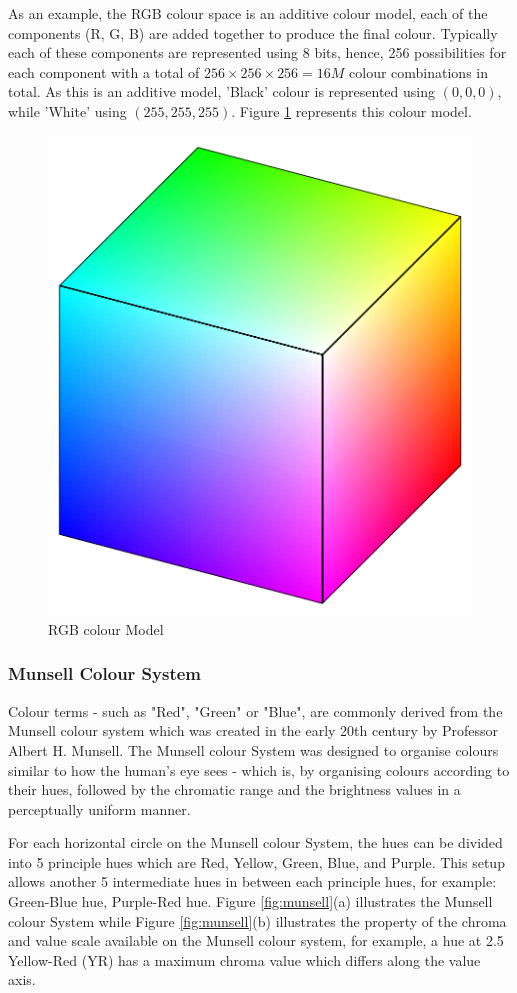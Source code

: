 As an example, the RGB colour space is an additive colour model, each of the components (R, G, B) are added together to produce the final colour. Typically each of these components are represented using 8 bits, hence, 256 possibilities for each component with a total of $256 \times 256 \times 256 = 16M$ colour combinations in total. As this is an additive model, 'Black' colour is  represented using $(0, 0, 0)$, while 'White' using $(255, 255, 255)$. Figure \ref{fig:rgb} represents this colour model.

\begin{figure}[hbt!]\centering
\includegraphics[width=.4\textwidth]{image/lit/rgbcolor.jpg}
\caption{RGB colour Model}
\label{fig:rgb}
\end{figure}


\subsubsection{Munsell Colour System}
\label{section:munsellcs}
Colour terms - such as "Red", "Green" or "Blue", are commonly derived from the Munsell colour system which was created in the early 20th century by Professor Albert H. Munsell. The Munsell colour System was designed to organise colours similar to how the human's eye sees - which is, by organising colours according to their hues, followed by the chromatic range and the brightness values in a perceptually uniform manner. 

For each horizontal circle on the Munsell colour System, the hues can be divided into 5 principle hues which are Red, Yellow, Green, Blue, and Purple. This setup allows another 5 intermediate hues in between each principle hues, for example: Green-Blue hue, Purple-Red hue. 
Figure \ref{fig:munsell}(a) illustrates the Munsell colour System while Figure \ref{fig:munsell}(b) illustrates the property of the chroma and value scale available on the Munsell colour system, for example, a hue at 2.5 Yellow-Red (YR) has a maximum chroma value which differs along the value axis. 




